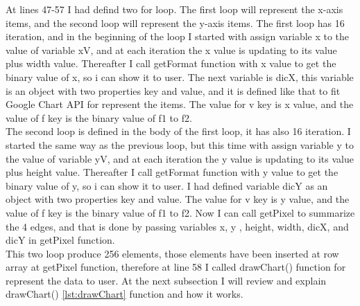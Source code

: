 \documentclass[11pt]{article}
\begin{document}
At lines 47-57 I had defind two for loop. The first loop will represent the x-axis items, and the second loop will represent the y-axis items.
The first loop has 16 iteration, and in the beginning of the loop I started with assign variable x to the value of variable xV, and at each iteration the x value is updating to its value plus width value. Thereafter I call getFormat function with x value to get the binary value of x, so i can show it to user. The next variable is dicX, this variable is an object with two properties key and value, and it is defined like that to fit Google Chart API for represent the items. The value for v key is x value, and the value of f key is the binary value of f1 to f2.\\
The second loop is defined in the body of the first loop, it has also 16 iteration. I started the same way as the previous loop, but this time with assign variable y to the value of variable yV, and at each iteration the y value is updating to its value plus height value. Thereafter I call getFormat function with y value to get the binary value of y, so i can show it to user. I had defined variable dicY as an object with two properties key and value. The value for v key is y value, and the value of f key is the binary value of f1 to f2. Now I can call getPixel to summarize the 4 edges, and that is done by passing variables x, y , height, width, dicX, and dicY in getPixel function.\\
This two loop produce 256 elements, those elements have been inserted at row array at getPixel function, therefore at line 58 I called drawChart() function for represent the data to user. At the next subsection I will review and explain drawChart() \ref{lst:drawChart} function and how it works.\\
\end{document}
